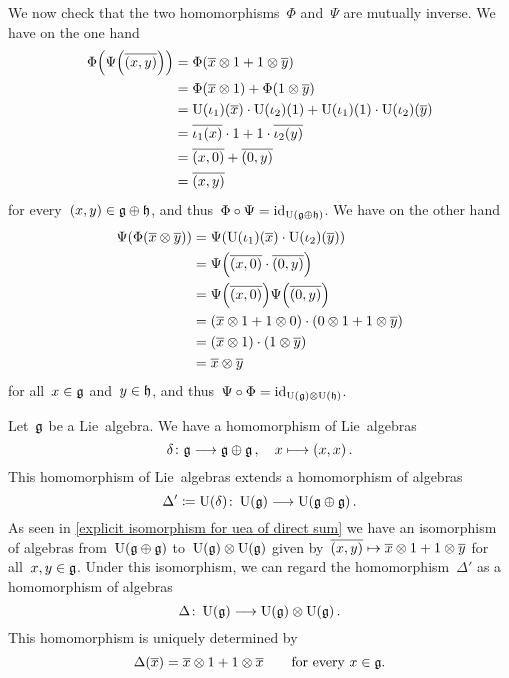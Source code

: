 \begin{example}
\begin{itemize}
			We now check that the two homomorphisms~$\Phi$ and~$\Psi$ are mutually inverse.
			We have on the one hand
			\begin{align*}
				\Phi\Bigl( \Psi\Bigl( \overline{(x,y)} \Bigr) \Bigr)
				&=
				\Phi( \overline{x} \otimes 1 + 1 \otimes \overline{y} )
				\\
				&=
				\Phi( \overline{x} \otimes 1 ) + \Phi( 1 \otimes \overline{y} )
				\\
				&=
				\operatorname{U}(\iota_1)(\overline{x}) \cdot \operatorname{U}(\iota_2)(1)
				+ \operatorname{U}(\iota_1)(1) \cdot \operatorname{U}(\iota_2)(\overline{y})
				\\
				&=
				\overline{\iota_1(x)} \cdot 1
				+ 1 \cdot \overline{\iota_2(y)}
				\\
				&=
				\overline{(x,0)} + \overline{(0,y)}
				\\
				&=
				\overline{(x,y)}
			\end{align*}
			for every~$(x,y) \in \mathfrak{g} \oplus \mathfrak{h}$, and thus~$\Phi \circ \Psi = \mathrm{id}_{\operatorname{U}(\mathfrak{g} \oplus \mathfrak{h})}$.
			We have on the other hand
			\begin{align*}
				\Psi( \Phi( \overline{x} \otimes \overline{y} ) )
				&=
				\Psi( \operatorname{U}(\iota_1)(\overline{x}) \cdot \operatorname{U}(\iota_2)(\overline{y}) )
				\\
				&=
				\Psi\Bigl( \overline{(x,0)} \cdot \overline{(0,y)} \Bigr)
				\\
				&=
				\Psi\Bigl( \overline{(x,0)} \Bigr)
				\Psi\Bigl( \overline{(0,y)} \Bigr)
				\\
				&=
				( \overline{x} \otimes 1 + 1 \otimes 0 )
				\cdot ( 0 \otimes 1 + 1 \otimes \overline{y} )
				\\
				&=
				(\overline{x} \otimes 1)
				\cdot (1 \otimes \overline{y})
				\\
				&=
				\overline{x} \otimes \overline{y}
			\end{align*}
			for all~$x \in \mathfrak{g}$ and~$y \in \mathfrak{h}$, and thus~$\Psi \circ \Phi = \mathrm{id}_{\operatorname{U}(\mathfrak{g}) \otimes \operatorname{U}(\mathfrak{h})}$.
	\end{itemize}
\end{example}


\begin{construction}
	\label{construction of comultiplication}
	Let~$\mathfrak{g}$ be a Lie~algebra.
	We have a homomorphism of Lie~algebras
	\[
		\delta
		\colon
		\glie
		\to
		\glie \oplus \glie \,,
		\quad
		x
		\mapsto
		(x,x) \,.
	\]
	This homomorphism of Lie~algebras extends a homomorphism of algebras
	\[
		\Delta'
		\defined
		\Univ(\delta)
		\colon
		\Univ(\glie)
		\to
		\Univ(\glie \oplus \glie) \,.
	\]
	As seen in \cref{explicit isomorphism for uea of direct sum} we have an isomorphism of algebras from~$\operatorname{U}(\mathfrak{g} \oplus \mathfrak{g})$ to~$\operatorname{U}(\mathfrak{g}) \otimes \operatorname{U}(\mathfrak{g})$ given by~$\class{(x,y)} \mapsto \class{x} \tensor 1 + 1 \tensor \class{y}$ for all~$x, y \in \mathfrak{g}$.
	Under this isomorphism, we can regard the homomorphism~$\Delta'$ as a homomorphism of algebras
	\[
		\Delta
		\colon
		\Univ(\glie)
		\to
		\Univ(\glie) \tensor \Univ(\glie) \,.
	\]
	This homomorphism is uniquely determined by
	\[
		\Delta( \overline{x} )
		=
		\overline{x} \otimes 1 + 1 \otimes \overline{x}
		\qquad
		\text{for every~$x \in \mathfrak{g}$.}
	\]
\end{construction}


